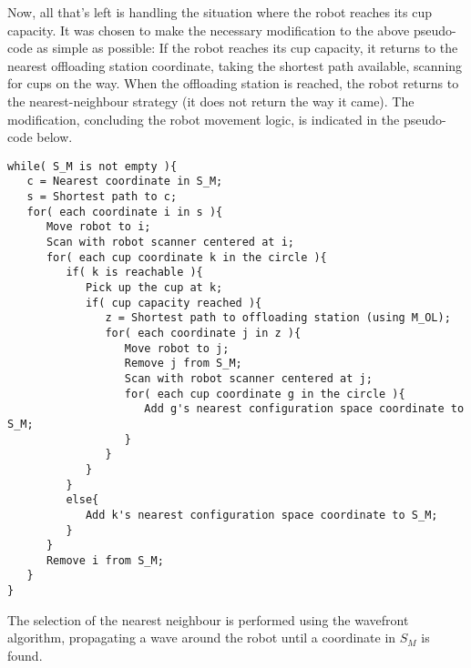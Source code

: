 Now, all that's left is handling the situation where the robot reaches its cup capacity.
It was chosen to make the necessary modification to the above pseudo-code as simple as possible:
If the robot reaches its cup capacity, it returns to the nearest offloading station coordinate,
taking the shortest path available, scanning for cups on the way. When the offloading station is reached,
the robot returns to the nearest-neighbour strategy (it does not return the way it came).
The modification, concluding the robot movement logic, is indicated in the pseudo-code below.

\begin{verbatim}
while( S_M is not empty ){
   c = Nearest coordinate in S_M;
   s = Shortest path to c;
   for( each coordinate i in s ){
      Move robot to i;
      Scan with robot scanner centered at i;
      for( each cup coordinate k in the circle ){
         if( k is reachable ){
            Pick up the cup at k;
            if( cup capacity reached ){
               z = Shortest path to offloading station (using M_OL);
               for( each coordinate j in z ){
                  Move robot to j;
                  Remove j from S_M;
                  Scan with robot scanner centered at j;
                  for( each cup coordinate g in the circle ){
                     Add g's nearest configuration space coordinate to S_M;
                  }
               }
            }
         }
         else{
            Add k's nearest configuration space coordinate to S_M;
         }
      }
      Remove i from S_M;
   }
}
\end{verbatim}

The selection of the nearest neighbour is performed using the wavefront algorithm, propagating
a wave around the robot until a coordinate in \(S_{M}\) is found.
